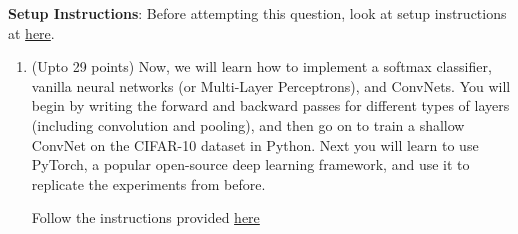 \documentclass[11pt,english]{article}
\begin{document}
\textbf{Setup Instructions}: Before attempting this question, look at setup instructions at 
\href{https://www.cc.gatech.edu/classes/AY2020/cs7643_spring/Z3o9P26CwTPZZMDXyWYDj3/hw1-q8-setup/}{here}.
\begin{enumerate}[resume]

\item (Upto 29 points)
Now, we will learn how to implement a softmax classifier, vanilla neural networks (or Multi-Layer Perceptrons), and ConvNets.   
You will begin by writing the forward and backward
passes for different types of layers (including convolution and pooling),
and then go on to train a shallow ConvNet on the CIFAR-10 dataset in Python.   
Next you will learn to use PyTorch, a popular open-source deep learning framework,
and use it to replicate the experiments from before.

Follow the instructions provided 
\href{https://www.cc.gatech.edu/classes/AY2020/cs7643_spring/Z3o9P26CwTPZZMDXyWYDj3/hw1-q8/}{here}
\end{enumerate}


\end{document}
